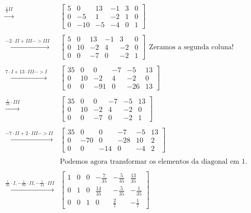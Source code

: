 \documentclass[
  letterpaper,
  DIV=11,
  numbers=noendperiod]{scrreprt}
\begin{document}
\[\begin{aligned}
    \stackrel{\frac{1}{3}II}{\rightarrow}
    &
    \left[\begin{array}{ccc|ccc}
        5 & 0 & 13 & -1 & 3 & 0 \\
        0 & -5 & 1 & -2 & 1 & 0 \\
        0 & -10 & -5 & -4 & 0 & 1
    \end{array}\right] \\ \\
    \stackrel{-2\cdot II + III -> III}{\rightarrow}
    &
    \left[\begin{array}{ccc|ccc}
        5 & 0 & 13 & -1 & 3 & 0 \\
        0 & 10 & -2 & 4 & -2 & 0 \\
        0 & 0 & -7 & 0 & -2 & 1
    \end{array}\right] ~~\text{Zeramos a segunda coluna!}\\ \\
    \stackrel{7\cdot I + 13\cdot III -> I}{\rightarrow}
    &
    \left[\begin{array}{ccc|ccc}
        35 & 0 & 0 & -7 & -5 & 13 \\
        0 & 10 & -2 & 4 & -2 & 0 \\
        0 & 0 & -91 & 0 & -26 & 13
    \end{array}\right]  \\ \\
    \stackrel{\frac{1}{13}\cdot III}{\rightarrow}
    &
    \left[\begin{array}{ccc|ccc}
        35 & 0 & 0 & -7 & -5 & 13 \\
        0 & 10 & -2 & 4 & -2 & 0 \\
        0 & 0 & -7 & 0 & -2 & 1
    \end{array}\right]  \\ \\
    \stackrel{-7\cdot II + 2 \cdot III -> II}{\rightarrow}
    &
    \left[\begin{array}{ccc|ccc}
        35 & 0 & 0 & -7 & -5 & 13 \\
        0 & -70 & 0 & -28 & 10 & 2 \\
        0 & 0 & -14 & 0 & -4 & 2
    \end{array}\right]\\ \\
    &\text{Podemos agora transformar os elementos da diagonal em 1.} \\ 
    \\
    \stackrel{\frac{1}{35}\cdot I, -\frac{1}{70} \cdot II, -\frac{1}{14} \cdot III}{\rightarrow}
    &
    \left[\begin{array}{ccc|ccc}
        1 & 0 & 0 & -\frac{7}{35} & -\frac{5}{35} & \frac{13}{35} \\
        0 & 1 & 0 & \frac{14}{35} & -\frac{5}{35} & -\frac{1}{35} \\
        0 & 0 & 1 & 0 & \frac{2}{7} & -\frac{1}{7}
    \end{array}\right]
\end{aligned}
\]
\end{document}
